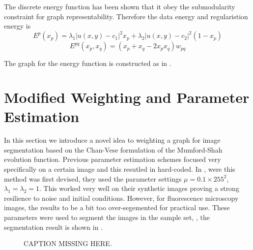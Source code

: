 \begin{definition} The discrete energy function  has been shown that it obey the submodularity constraint for graph representability. Therefore the data energy and regularistion energy is
	\begin{equation}
		E^p(x_p) = \lambda_1 |u(x,y)-c_1|^2 x_p + \lambda_2 |u(x,y)-c_2|^2 (1-x_p)
	\end{equation}
	\begin{equation}
	E^{pq}(x_p,x_q) = (x_p + x_q - 2x_px_q)w_{pq}
	\end{equation}
\end{definition}
The graph for the energy function is constructed as in \citep{Kolmogorov2004}.

\section{Modified Weighting and Parameter Estimation}
\label{sec:cvgc_weightingandparameterestimation}

In this section we introduce a novel idea to weighting  a graph for image segmentation based on the Chan-Vese formulation of the Mumford-Shah evolution function. Previous parameter estimation schemes focused very specifically on a certain image and this resutled in hard-coded. In \citep{ElZehiry2007}, were this method was first devised, they used the parameter settings $\mu = 0.1 \times 255^2$, $\lambda_1 = \lambda_2 = 1$. This worked very well on their synthetic images proving a strong resilience to noise and initial conditions. However, for fluorescence microscopy images, the results to be a bit too over-segemented for practical use. These parameters were used to segment the images in the sample set, , the segmentation result is shown in .

\begin{figure}[!h]
	\centering
	\caption{CAPTION MISSING HERE.}
	\label{fig:samplesetdefaultcv}
\end{figure}

